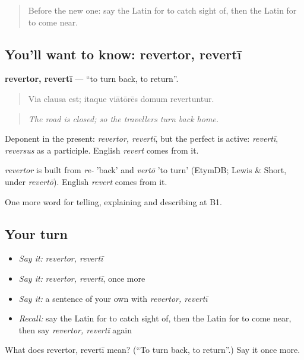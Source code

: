 \begin{quote}
Before the new one: say the Latin for to catch sight of, then the Latin for to come near.
\end{quote}

\subsection*{You'll want to know: revertor, revertī}
\textbf{revertor, revertī} — \textquotedblleft{}to turn back, to return\textquotedblright{}.

\begin{quote}
Via clausa est; itaque viātōrēs domum revertuntur.
\end{quote}

\begin{quote}
\emph{The road is closed; so the travellers turn back home.}
\end{quote}

Deponent in the present: \emph{revertor, revertī}, but the perfect is active: \emph{revertī}, \emph{reversus} as a participle. English \emph{revert} comes from it.

\begin{cousinweb}
\emph{revertor} is built from \emph{re-} 'back' and \emph{vertō} 'to turn' (EtymDB; Lewis \& Short, under \emph{revertō}). English \emph{revert} comes from it.
\end{cousinweb}

\begin{grammarlens}[title={What you've built}]
One more word for telling, explaining and describing at B1.
\end{grammarlens}

\subsection*{Your turn}
\begin{itemize}
\raggedright
  \item \emph{Say it:} \emph{revertor, revertī}
  \item \emph{Say it:} \emph{revertor, revertī}, once more
  \item \emph{Say it:} a sentence of your own with \emph{revertor, revertī}
  \item \emph{Recall:} say the Latin for to catch sight of, then the Latin for to come near, then say \emph{revertor, revertī} again
\end{itemize}

\begin{tcolorbox}[breakable,colback=teal!4,colframe=teal!35!black,title={Before you move on}]
What does revertor, revertī mean? (\textquotedblleft{}To turn back, to return\textquotedblright{}.) Say it once more.
\end{tcolorbox}
